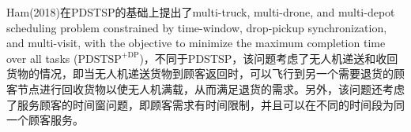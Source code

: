Ham(2018)\cite{hamIntegratedSchedulingMtruck2018}在PDSTSP的基础上提出了multi-truck, multi-drone, and multi-depot scheduling problem constrained by time-window, drop-pickup synchronization, and multi-visit, with the objective to minimize the maximum completion time over all tasks ($\text{PDSTSP}^{\text{+DP}}$)，不同于PDSTSP，该问题考虑了无人机递送和收回货物的情况，即当无人机递送货物到顾客返回时，可以飞行到另一个需要退货的顾客节点进行回收货物以使无人机满载，从而满足退货的需求。另外，该问题还考虑了服务顾客的时间窗问题，即顾客需求有时间限制，并且可以在不同的时间段为同一个顾客服务。
